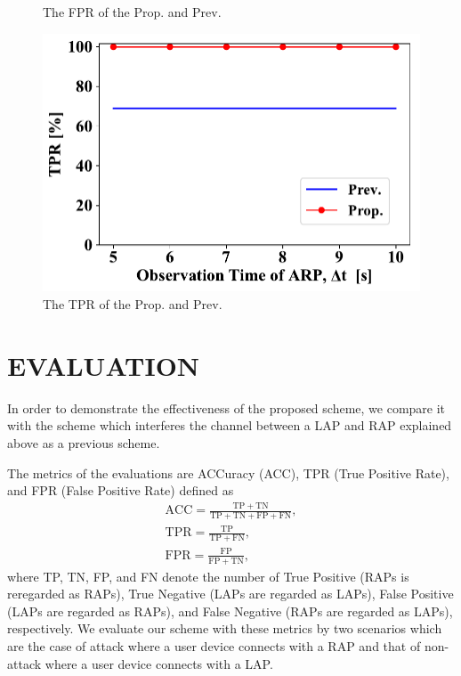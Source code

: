 \documentclass[conference]{IEEEtran}
\begin{document}
\begin{figure}[ht]
\begin{minipage}{0.33\hsize}
\begin{center}
        \end{center}
        \caption{The FPR of the Prop. and Prev.}
        \label{fig:fpr}
    \end{minipage}
    \begin{minipage}{0.33\hsize}
        \begin{center}
            \includegraphics[scale=0.35]{figure/TPR.pdf}
        \end{center}
        \caption{The TPR of the Prop. and Prev.}
        \label{fig:tpr}
    \end{minipage}
\vspace{-1zh}
\end{figure}
\section{EVALUATION}\label{sec:5}
In order to demonstrate the effectiveness of the proposed scheme, we compare it with the scheme \cite{previous} which interferes the channel between a LAP and RAP explained above as a previous scheme.

The metrics of the evaluations are ACCuracy (ACC), TPR (True Positive Rate), and FPR (False Positive Rate) defined as
\begin{gather}
    \mathrm{ACC} = \frac{\mathrm{TP} + \mathrm{TN}}{\mathrm{TP} + \mathrm{TN} + \mathrm{FP} + \mathrm{FN}}, \\
    \mathrm{TPR} = \frac{\mathrm{TP}}{\mathrm{TP} + \mathrm{FN}}, \\
    \mathrm{FPR} = \frac{\mathrm{FP}}{\mathrm{FP} + \mathrm{TN}},
\end{gather}
where TP, TN, FP, and FN denote the number of True Positive (RAPs is reregarded as RAPs), True Negative (LAPs are regarded as LAPs), False Positive (LAPs are regarded as RAPs), and False Negative (RAPs are regarded as LAPs), respectively.
We evaluate our scheme with these metrics by two scenarios which are the case of attack where a user device connects with a RAP and that of non-attack where a user device connects with a LAP.
\end{document}
